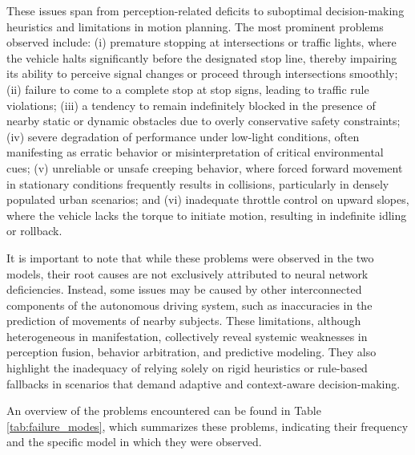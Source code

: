 These issues span from perception-related deficits to suboptimal decision-making heuristics and limitations in motion planning. The most prominent problems observed include: (i) premature stopping at intersections or traffic lights, where the vehicle halts significantly before the designated stop line, thereby impairing its ability to perceive signal changes or proceed through intersections smoothly; (ii) failure to come to a complete stop at stop signs, leading to traffic rule violations; (iii) a tendency to remain indefinitely blocked in the presence of nearby static or dynamic obstacles due to overly conservative safety constraints; (iv) severe degradation of performance under low-light conditions, often manifesting as erratic behavior or misinterpretation of critical environmental cues; (v) unreliable or unsafe creeping behavior, where forced forward movement in stationary conditions frequently results in collisions, particularly in densely populated urban scenarios; and (vi) inadequate throttle control on upward slopes, where the vehicle lacks the torque to initiate motion, resulting in indefinite idling or rollback.

It is important to note that while these problems were observed in the two models, their root causes are not exclusively attributed to neural network deficiencies. Instead, some issues may be caused by other interconnected components of the autonomous driving system, such as inaccuracies in the prediction of movements of nearby subjects.
These limitations, although heterogeneous in manifestation, collectively reveal systemic weaknesses in perception fusion, behavior arbitration, and predictive modeling. They also highlight the inadequacy of relying solely on rigid heuristics or rule-based fallbacks in scenarios that demand adaptive and context-aware decision-making. 

An overview of the problems encountered can be found in Table \ref{tab:failure_modes}, which summarizes these problems, indicating their frequency and the specific model in which they were observed.

